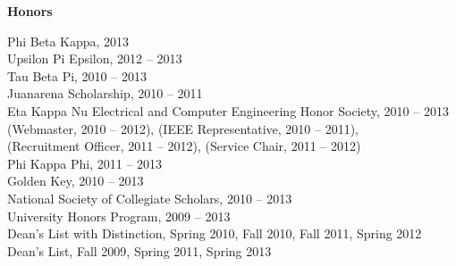 \documentclass[10pt,a4paper]{article}
\newcommand{\resumesection}[2]{       %
    \noindent                         %
    \begin{minipage}[t]               %
        {0.15\textwidth}              %
        \begin{flushleft}             %
            {\bf #1}                  %
        \end{flushleft}               %
    \end{minipage}                    %
    \hfill                            %
    \begin{minipage}[t]               %
        {0.85\textwidth}              %
        \begin{flushleft}             %
            #2                        %
        \end{flushleft}               %
    \end{minipage}                    %
}                                     %
\newcommand{\resumeline}[1]
    {\noindent #1 \\}
\newcommand{\tab}{\hspace*{2em}}
\begin{document}
\vspace{-0.5em}
\addvspace{1em}
\resumesection
    {Honors} {
     \resumeline{Phi Beta Kappa, 2013}
     \resumeline{Upsilon Pi Epsilon, 2012 – 2013}
     \resumeline{Tau Beta Pi, 2010 – 2013}
     \resumeline{Juanarena Scholarship, 2010 – 2011}
     \resumeline{Eta Kappa Nu Electrical and Computer Engineering Honor Society, 2010 – 2013 \\
         \tab (Webmaster, 2010 – 2012), (IEEE Representative, 2010 – 2011), \\
         \tab (Recruitment Officer, 2011 – 2012), (Service Chair, 2011 – 2012)}
     \resumeline{Phi Kappa Phi, 2011 – 2013}
     \resumeline{Golden Key, 2010 – 2013}
     \resumeline{National Society of Collegiate Scholars, 2010 – 2013}
     \resumeline{University Honors Program, 2009 – 2013}
     \resumeline{Dean’s List with Distinction, Spring 2010, Fall 2010, Fall 2011, Spring 2012}
     \resumeline{Dean’s List, Fall 2009, Spring 2011, Spring 2013}\vspace{-2em}
    }

\end{document}
